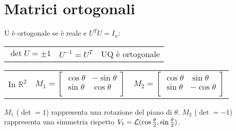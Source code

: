 \section{Matrici ortogonali}

U è ortogonale se è reale e $U^TU=I_n$:

\begin{tabular}{lll}
	$\det U = \pm1$ & $U^{-1}=U^T$ & UQ è ortogonale
\end{tabular}

\begin{tabular}{lll}
	In $\mathbb{R}^2$ &
	$
		M_1 = \begin{bmatrix}
			\cos\theta & -\sin\theta \\
			\sin\theta & \cos\theta \\
		\end{bmatrix}
	$ &
	$
		M_2 = \begin{bmatrix}
			\cos\theta & \sin\theta \\
			\sin\theta & -\cos\theta \\
		\end{bmatrix}
	$
\end{tabular}

$M_1$ ($\det = 1$) rappresenta una rotazione del piano di $\theta$. $M_2$ ($\det = -1$) rappresenta una simmetria rispetto $V_1 = \mathcal{L}(\cos\frac{\theta}{2}, \sin\frac{\theta}{2})$.
